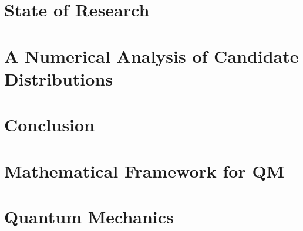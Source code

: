 \documentclass[titlepage]{report}
\theoremstyle{remark}
\begin{document}
 \chapter{State of Research}
 
 \chapter{A Numerical Analysis of Candidate Distributions}
 
 \chapter{Conclusion}
 

\begin{appendices}
	\chapter{Mathematical Framework for QM}
	
	\chapter{Quantum Mechanics}
	
%	
\end{appendices}

%
\printbibliography
\end{document}
